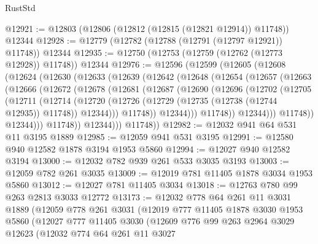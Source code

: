 \begin{lexlean}{RustStd}
\begin{coremodule}
@12921 := @12803 (@12806 (@12812 (@12815 (@12821 @12914)) @11748)) @12344
@12928 := @12779 (@12782 (@12788 (@12791 (@12797 @12921)) @11748)) @12344
@12935 := @12750 (@12753 (@12759 (@12762 (@12773 @12928)) @11748)) @12344
@12976 := @12596
    (@12599
      (@12605
        (@12608
          (@12624
            (@12630
              (@12633
                (@12639
                  (@12642
                    (@12648
                      (@12654
                        (@12657
                          (@12663
                            (@12666
                              (@12672
                                (@12678
                                  (@12681
                                    (@12687
                                      (@12690
                                        (@12696
                                          (@12702
                                            (@12705
                                              (@12711
                                                (@12714
                                                  (@12720
                                                    (@12726
                                                      (@12729
                                                        (@12735 (@12738 (@12744 @12935)) @11748))
                                                      @12344)))
                                                @11748))
                                            @12344)))
                                      @11748))
                                  @12344)))
                            @11748))
                        @12344)))
                  @11748))
              @12344)))
        @11748))
@12982 := @12032 @941 @64 @531 @11 @3195 @1889
@12985 := @12059 @941 @531 @3195
@12991 := @12580 @940 @12582 @1878 @3194 @1953 @5860
@12994 := @12027 @940 @12582 @3194
@13000 := @12032 @782 @939 @261 @533 @3035 @3193
@13003 := @12059 @782 @261 @3035
@13009 := @12019 @781 @11405 @1878 @3034 @1953 @5860
@13012 := @12027 @781 @11405 @3034
@13018 := @12763 @780 @99 @263 @2813 @3033 @12772
@13173 := @12032
    @778
    @64
    @261
    @11
    @3031
    @1889
    (@12059
      @778
      @261
      @3031
      (@12019
        @777
        @11405
        @1878
        @3030
        @1953
        @5860
        (@12027
          @777
          @11405
          @3030
          (@12609
            @776
            @99
            @263
            @2964
            @3029
            @12623
            (@12032
              @774
              @64
              @261
              @11
              @3027

\end{coremodule}
\end{lexlean}
